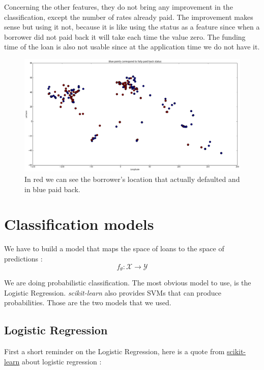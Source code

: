 		Concerning the other features, they do not bring any improvement in the classification, except the number of rates already paid. The improvement makes sense but using it not, because it is like using the status as a feature since when a borrower did not paid back it will take each time the value zero. The funding time of the loan is also not usable since at the application time we do not have it.\\

		\begin{figure}[h]
			\centering
			\includegraphics[width=\textwidth]{images/loc_def.png}
			\caption{In red we can see the borrower's location that actually defaulted and in blue paid back.}
			\label{fig:loc_def}
		\end{figure}

\section{Classification models}
\label{sec:models}
	We have to build a model that maps the space of loans to the space of predictions : $$f_\theta:\mathcal{X}\rightarrow \mathcal{Y}$$

	We are doing probabilistic classification. The most obvious model to use, is the Logistic Regression. \textit{scikit-learn} also provides SVMs that can produce probabilities. Those are the two models that we used.

	\subsection{Logistic Regression}
		First a short reminder on the Logistic Regression, here is a quote from \href{http://scikit-learn.org/stable/modules/linear_model.html#logistic-regression}{scikit-learn} about logistic regression :\\

